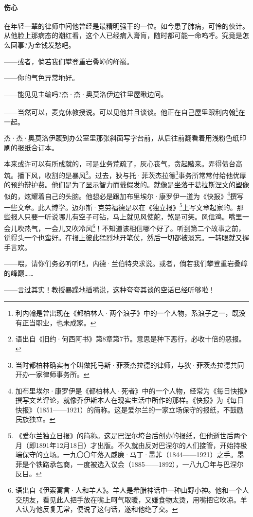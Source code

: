 \paragraph*{伤心}
\par 在年轻一辈的律师中间他曾经是最精明强干的一位。如今患了肺病，可怜的伙计。从他脸上那病态的潮红看，这个人已经病入膏肓，随时都可能一命呜呼。究竟是怎么回事?为金钱发愁吧。
\par ——或者，倘若我们攀登重岩叠嶂的峰巅。
\par ——你的气色异常地好。
\par ——能见见主编吗?杰·杰·奥莫洛伊边往里屋瞅边问。
\par ——当然可以，麦克休教授说。可以见他并且谈谈。他正在自己屋里跟利内翰\footnote{利内翰是曾出现在《都柏林人·两个浪子》中的一个人物，系浪子之一，既没有正当职业，也未成家。}在一起。
\par 杰·杰·奥莫洛伊踱到办公室里那张斜面写字台前，从后往前翻看着用浅粉色纸印刷的报纸合订本。
\par 本来或许可以有所成就的，可是业务荒疏了，灰心丧气，贪起赌来。弄得债台高筑。播下风，收割的是暴风\footnote{语出自《旧约·何西阿书》第8章第7节。意思是种下恶行，必收十倍的恶报。}。过去，狄与托·菲茨杰拉德\footnote{当时都柏林确实有个叫做托马斯·菲茨杰拉德的律师，与狄·菲茨杰拉德共同开办一家律师事务所。}事务所常常付给他优厚的预约辩护费。他们是为了显示智力而戴假发的。就像是坐落于葛拉斯涅文的塑像似的，炫耀着自己的头脑。他想必是跟加布里埃尔·康罗伊一道为《快报》\footnote{加布里埃尔·康罗伊是《都柏林人·死者》中的一个人物，经常为《每日快报》撰写文艺评论，就像乔伊斯本人在现实生活中所作的那样。《快报》为《每日快报》（1851——1921）的简称。这是爱尔兰的一家立场保守的报纸，不鼓励民族独立。}撰写一些文章。此人博学。迈尔斯·克劳福德是以在《独立报》\footnote{《爱尔兰独立日报》的简称。这是巴涅尔垮台后创办的报纸，但他逝世后两个月（即1891年12月18日）才出版。不久就由反对巴涅尔的人们接管，开始持极端保守的立场。一九〇〇年落入威廉·马丁·墨菲（1844——1921）之手。墨菲是个铁路承包商，一度被选入议会（1885——1892），一八九〇年与巴涅尔反目。}上写文章起家的。那些报人只要一听说哪儿有空子可钻，马上就见风使舵，煞是可笑。风信鸡。嘴里一会儿吹热气，一会儿又吹冷风\footnote{语出自《伊索寓言·人和羊人》。羊人是希腊神话中一种山野小神。他和一个人交朋友，看见此人把手放在嘴上呵气取暖，又嫌食物太烫，用嘴把它吹凉。羊人认为他反复无常，便说了这句话，遂和他绝了交。}！不知道该相信哪个好了。听到第二个故事之前，觉得头一个也蛮好。在报上彼此猛烈地开笔仗，然后一切都被淡忘。一转眼就又握手言欢。
\par ——喂，请你们务必听听吧，内德·兰伯特央求说。或者，倘若我们攀登重岩叠嶂的峰巅……
\par ——言过其实！教授暴躁地插嘴说，这种夸夸其谈的空话已经听够啦！
